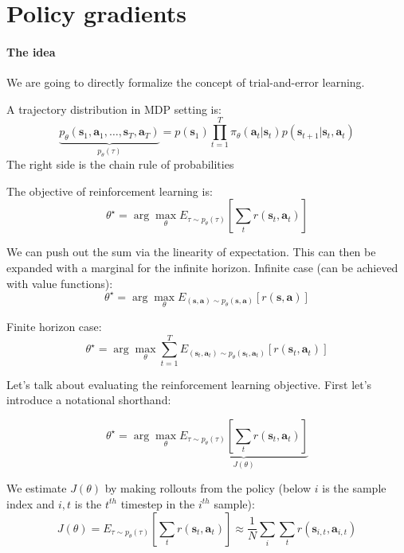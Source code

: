 \documentclass{report}
\newcommand{\argmax}{\arg\!\max}
\begin{document}
\section{Policy gradients}
\paragraph{The idea} We are going to directly formalize the concept of trial-and-error learning.


 A trajectory distribution in MDP setting is:
 \begin{equation}
 		\underbrace{p_\theta(\bm{s}_1, \bm{a}_1, \dots, \bm{s}_T, \bm{a}_T)}_{p_\theta(\tau)} = p(\bm{s}_1) \prod^{T}_{t=1} \pi_{\theta} (\bm{a}_t | \bm{s}_t) p (\bm{s}_{t+1} | \bm{s}_t, \bm{a}_t)
 \end{equation}
The right side is the chain rule of probabilities

The objective of reinforcement learning is:
\begin{equation}
		\theta^\star = \argmax_\theta E_{\tau \sim p_\theta (\tau)} \left [ \sum_t r(\bm{s}_t, \bm{a}_t) \right ]
\end{equation}

We can push out the sum via the linearity of expectation.
This can then be expanded with a marginal for the infinite horizon.
Infinite case (can be achieved with value functions):
\begin{equation}		
		\theta^\star = \argmax_\theta E_{(\bm{s}, \bm{a}) \sim p_\theta (\bm{s}, \bm{a})} \left [r(\bm{s}, \bm{a}) \right]
\end{equation}

Finite horizon case:
\begin{equation}		
		\theta^\star = \argmax_\theta \sum^{T}_{t=1}  E_{(\bm{s}_t, \bm{a}_t) \sim p_\theta (\bm{s}_t, \bm{a}_t)} \left [ r(\bm{s}_t, \bm{a}_t) \right]
\end{equation}


Let's talk about evaluating the reinforcement learning objective.
First let's introduce a notational shorthand:

\begin{equation}
		\theta^\star = \argmax_\theta \underbrace{E_{\tau \sim p_\theta (\tau)} \left [ \sum_t r(\bm{s}_t, \bm{a}_t) \right ]}_{J(\theta)}
\end{equation}

We estimate $J(\theta)$ by making rollouts from the policy (below $i$ is the sample index and $i,t$ is the $t^{th}$ timestep
in the $i^{th}$ sample):
\begin{equation}
		J(\theta) = E_{\tau \sim p_\theta(\tau)} \left [ \sum_t r(\bm{s}_t, \bm{a}_t) \right ] \approx 
		\frac{1}{N} \sum_i \sum_t r(\bm{s}_{i,t}, \bm{a}_{i,t})
\end{equation}
\end{document}

